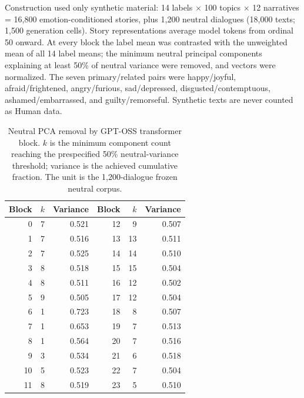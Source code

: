Construction used only synthetic material: 14 labels $\times$ 100 topics $\times$ 12 narratives = 16,800 emotion-conditioned stories, plus 1,200 neutral dialogues (18,000 texts; 1,500 generation cells). Story representations average model tokens from ordinal 50 onward. At every block the label mean was contrasted with the unweighted mean of all 14 label means; the minimum neutral principal components explaining at least 50\% of neutral variance were removed, and vectors were normalized. The seven primary/related pairs were happy/joyful, afraid/frightened, angry/furious, sad/depressed, disgusted/contemptuous, ashamed/embarrassed, and guilty/remorseful. Synthetic texts are never counted as Human data.

\begin{table}[t]
\caption{Neutral PCA removal by GPT-OSS transformer block. $k$ is the minimum component count reaching the prespecified 50\% neutral-variance threshold; variance is the achieved cumulative fraction. The unit is the 1,200-dialogue frozen neutral corpus.}
\label{tab:app-pca-components}
\centering
\scriptsize
\begin{tabular}{rrrrrr}
\toprule
Block & $k$ & Variance & Block & $k$ & Variance \\
\midrule
0 & 7 & 0.521 & 12 & 9 & 0.507 \\
1 & 7 & 0.516 & 13 & 13 & 0.511 \\
2 & 7 & 0.525 & 14 & 14 & 0.510 \\
3 & 8 & 0.518 & 15 & 15 & 0.504 \\
4 & 8 & 0.511 & 16 & 12 & 0.502 \\
5 & 9 & 0.505 & 17 & 12 & 0.504 \\
6 & 1 & 0.723 & 18 & 8 & 0.507 \\
7 & 1 & 0.653 & 19 & 7 & 0.513 \\
8 & 1 & 0.564 & 20 & 7 & 0.516 \\
9 & 3 & 0.534 & 21 & 6 & 0.518 \\
10 & 5 & 0.523 & 22 & 7 & 0.504 \\
11 & 8 & 0.519 & 23 & 5 & 0.510 \\
\bottomrule
\end{tabular}
\end{table}

